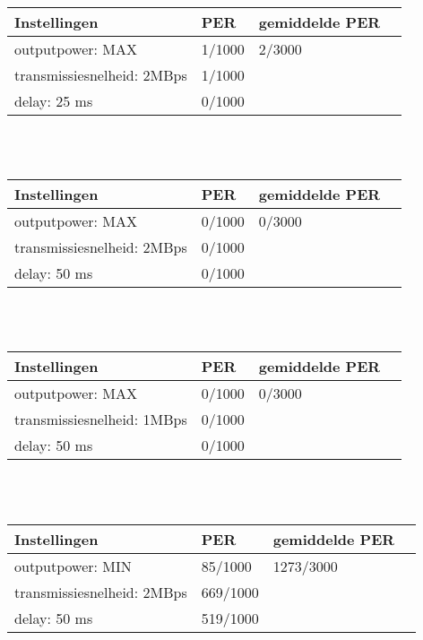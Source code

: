 \documentclass{article}
\begin{document}
    \begin{tabular}{ | l | l | l | p{5cm} |}
    \hline
    Instellingen 				& PER 		& gemiddelde PER\\ \hline
    outputpower: MAX 			& 1/1000 	& 2/3000		\\
    transmissiesnelheid: 2MBps 	& 1/1000 	& 				\\
    delay: 25 ms 				& 0/1000	&  				\\ \hline
    \end{tabular}\\
    \\
    
    \begin{tabular}{ | l | l | l | p{5cm} |}
    \hline
    Instellingen				& PER 		& gemiddelde PER\\ \hline
    outputpower: MAX 			& 0/1000 	& 0/3000		\\
    transmissiesnelheid: 2MBps 	& 0/1000 	&  				\\
    delay: 50 ms 				& 0/1000	&  				\\ \hline
    \end{tabular}\\
    \\
    
    \begin{tabular}{ | l | l | l | p{5cm} |}
    \hline
    Instellingen 				& PER 		& gemiddelde PER\\ \hline
    outputpower: MAX 			& 0/1000 	& 0/3000		\\
    transmissiesnelheid: 1MBps 	& 0/1000 	&  				\\
    delay: 50 ms 				& 0/1000	&  				\\ \hline
    \end{tabular}\\
    \\
    
    \begin{tabular}{ | l | l | l | p{5cm} |}
    \hline
    Instellingen				& PER 		& gemiddelde PER\\ \hline
    outputpower: MIN 			& 85/1000 	& 1273/3000		\\ 
    transmissiesnelheid: 2MBps 	& 669/1000  &  				\\ 
    delay: 50 ms 				& 519/1000 	&  				\\ \hline
    \end{tabular}\\
    \\
    
\end{document}

